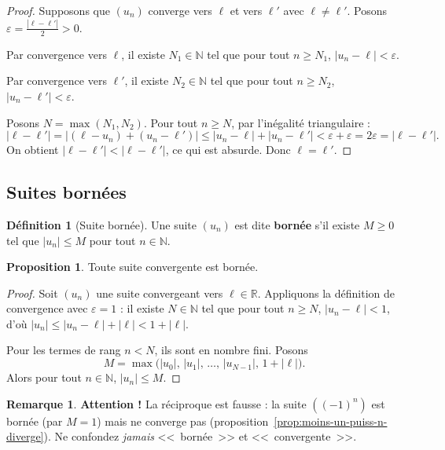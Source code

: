 \documentclass[12pt,a4paper,openany]{book}
\theoremstyle{definition}
\newtheorem{definition}{Définition}[chapter]
\newtheorem{proposition}{Proposition}[chapter]
\newtheorem{remarque}{Remarque}[chapter]
\newcommand{\N}{\mathbb{N}}
\newcommand{\R}{\mathbb{R}}
\newcommand{\eps}{\varepsilon}
\newcommand{\abs}[1]{\left\lvert #1 \right\rvert}
\begin{document}
\begin{proof}
  Supposons que $(u_n)$ converge vers $\ell$ et vers $\ell'$ avec $\ell \neq \ell'$.
  Posons $\eps = \frac{\abs{\ell - \ell'}}{2} > 0$.

  Par convergence vers $\ell$, il existe $N_1 \in \N$ tel que pour tout $n \geq N_1$,
  $\abs{u_n - \ell} < \eps$.

  Par convergence vers $\ell'$, il existe $N_2 \in \N$ tel que pour tout $n \geq N_2$,
  $\abs{u_n - \ell'} < \eps$.

  Posons $N = \max(N_1, N_2)$. Pour tout $n \geq N$, par l'inégalité triangulaire :
  \[
    \abs{\ell - \ell'} = \abs{(\ell - u_n) + (u_n - \ell')}
      \leq \abs{u_n - \ell} + \abs{u_n - \ell'}
      < \eps + \eps = 2\eps = \abs{\ell - \ell'}.
  \]
  On obtient $\abs{\ell - \ell'} < \abs{\ell - \ell'}$, ce qui est absurde.
  Donc $\ell = \ell'$.
\end{proof}

\subsection{Suites bornées}

\begin{definition}[Suite bornée]\label{def:suite-bornee}
  Une suite $(u_n)$ est dite \textbf{bornée} s'il existe $M \geq 0$ tel que
  $\abs{u_n} \leq M$ pour tout $n \in \N$.
\end{definition}

\begin{proposition}\label{prop:cv-implique-bornee}
  Toute suite convergente est bornée.
\end{proposition}

\begin{proof}
  Soit $(u_n)$ une suite convergeant vers $\ell \in \R$. Appliquons la définition de
  convergence avec $\eps = 1$ : il existe $N \in \N$ tel que pour tout $n \geq N$,
  $\abs{u_n - \ell} < 1$, d'où $\abs{u_n} \leq \abs{u_n - \ell} + \abs{\ell} < 1 + \abs{\ell}$.

  Pour les termes de rang $n < N$, ils sont en nombre fini. Posons
  \[
    M = \max\bigl(\abs{u_0},\, \abs{u_1},\, \ldots,\, \abs{u_{N-1}},\, 1 + \abs{\ell}\bigr).
  \]
  Alors pour tout $n \in \N$, $\abs{u_n} \leq M$.
\end{proof}

\begin{remarque}\label{rem:bornee-pas-cv}
  \textbf{Attention !} La réciproque est fausse : la suite $((-1)^n)$ est bornée
  (par $M = 1$) mais ne converge pas (proposition~\ref{prop:moins-un-puiss-n-diverge}).
  Ne confondez \emph{jamais} <<~bornée~>> et <<~convergente~>>.
\end{remarque}
\end{document}
